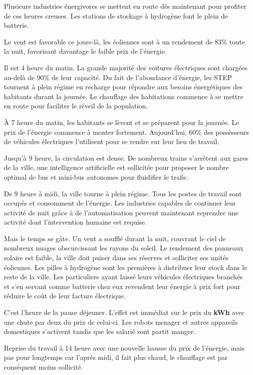 Plusieurs industries énergivores se mettent en route dés maintenant pour profiter de ces heures creuses.
Les stations de stockage à hydrogène font le plein de batterie.

Le vent est favorable ce jours-là, les éoliennes sont à un rendement de 83\% toute la nuit,
favorisant davantage le faible prix de l'énergie.

Il est 4 heure du matin. La grande majorité des voitures électriques sont chargées au-delà de 90\% de leur capacité.
Du fait de l'abondance d'énergie, les STEP tournent à plein régime en recharge pour répondre aux besoins
énergétiques des habitants durant la journée.
Le chauffage des habitations commence à se mettre en route pour faciliter le réveil de la population.

À 7 heure du matin, les habitants se lèvent et se préparent pour la journée. Le prix de l'énergie commence à monter
fortement. Aujourd'hui, 60\% des possèsseurs de véhicules électriques l'utilisent pour se rendre sur leur lieu de travail.

Jusqu'à 9 heure, la circulation est dense. De nombreux trains s'arrêtent aux gares de la ville,
une intelligence artificielle est sollicitée pour proposer le nombre optimal
de bus et mini-bus autonomes pour fluidifier le trafic.

De 9 heure à midi, la ville tourne à plein régime. Tous les postes de travail sont occupés et consomment de l'énergie.
Les industries capables de continuer leur activité de nuit grâce à de l'automatisation peuvent maintenant
reprendre une activité dont l'intervention humaine est requise.

Mais le temps se gâte. Un vent a soufflé durant la nuit, couvrant le ciel de nombreux nuages obscurcissant
les rayons du soleil. Le rendement des panneaux solaire est faible, la ville doit puiser dans
ses réserves et solliciter ses unités éoliennes.
Les pilles à hydrogène sont les premières à distribuer leur stock dans le reste de la ville.
Les particuliers ayant laissé leurs véhicules électriques branchés et s'en servant comme batterie chez eux revendent
leur énergie à prix fort pour réduire le coût de leur facture électrique.

C'est l'heure de la pause déjeuner. L'effet est immédiat sur le prix du \textbf{kWh} avec une chute par deux du prix
de celui-ci. Les robots menager et autres appareils domestiques s'activent tandis que les salarié sont partit manger.

Reprise du travail à 14 heure avec une nouvelle hausse du prix de l'énergie, mais pas pour longtemps car l'après midi,
il fait plus chaud, le chauffage est par conséquent moins sollicité.

